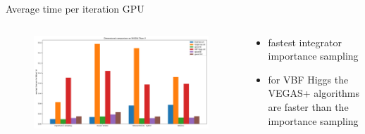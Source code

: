 \documentclass[t,handout,professionalfont,serif]{beamer}
\begin{document}
\begin{frame}{Average time per iteration GPU}
	
		\tiny
	\begin{columns}
		\begin{column}{0.7 \textwidth}
			\begin{figure}
				\includegraphics[width= \columnwidth]{../tex/images/GPU_final.png}
			\end{figure}
			
		\end{column}
			\hspace{-0.5cm}
		\begin{column}{0.3 \textwidth}
			\vspace{0.7cm}
			
			\begin{itemize}
				
				\item fastest integrator importance sampling
				\item for VBF Higgs the VEGAS+ algorithms are faster than the importance sampling
			\end{itemize}
		\end{column}
	\end{columns}


\end{frame}

	
\end{document}
